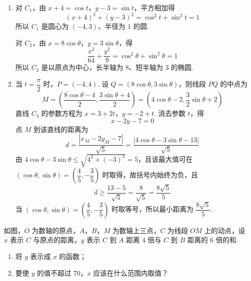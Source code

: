 \begin{solution}
\begin{enumerate}
\item 对 \(C_1\)，由 \(x+4=\cos t\)，\(y-3=\sin t\)，平方相加得
\[
(x+4)^2+(y-3)^2=\cos^2t+\sin^2t=1
\]
所以 \(C_1\) 是圆心为 \((-4,3)\)、半径为 \(1\) 的圆.

对 \(C_2\)，由 \(x=8\cos\theta\)，\(y=3\sin\theta\)，得
\[
\frac{x^2}{64}+\frac{y^2}{9}=\cos^2\theta+\sin^2\theta=1
\]
所以 \(C_2\) 是以原点为中心，长半轴为 \(8\)、短半轴为 \(3\) 的椭圆.

\item 当 \(t=\dfrac\pi2\) 时，\(P=(-4,4)\). 设 \(Q=(8\cos\theta,3\sin\theta)\)，则线段 \(PQ\) 的中点为
\[
M=\left(\frac{8\cos\theta-4}{2},\frac{3\sin\theta+4}{2}\right)=\left(4\cos\theta-2,\frac32\sin\theta+2\right)
\]
直线 \(C_3\) 的参数方程为 \(x=3+2t\)，\(y=-2+t\). 消去参数 \(t\)，得
\[
x-2y-7=0
\]
点 \(M\) 到该直线的距离为
\[
d=\frac{|x_M-2y_M-7|}{\sqrt5}=\frac{|4\cos\theta-3\sin\theta-13|}{\sqrt5}
\]
由 \(4\cos\theta-3\sin\theta\leqslant\sqrt{4^2+(-3)^2}=5\)，且该最大值可在 \((\cos\theta,\sin\theta)=\left(\dfrac45,-\dfrac35\right)\) 时取得，故括号内始终为负，且
\[
d\geqslant\frac{13-5}{\sqrt5}=\frac{8}{\sqrt5}=\frac{8\sqrt5}{5}
\]
当 \((\cos\theta,\sin\theta)=\left(\dfrac45,-\dfrac35\right)\) 时取等号，所以最小距离为 \(\dfrac{8\sqrt5}{5}\).
\end{enumerate}
\end{solution}

\begin{problem}
如图，\(O\) 为数轴的原点，\(A\)，\(B\)，\(M\) 为数轴上三点，\(C\) 为线段 \(OM\) 上的动点，设 \(x\) 表示 \(C\) 与原点的距离，\(y\) 表示 \(C\) 到 \(A\) 距离 \(4\) 倍与 \(C\) 到 \(B\) 距离的 \(6\) 倍的和.

\begin{enumerate}
\item 将 \(y\) 表示成 \(x\) 的函数；
\item 要使 \(y\) 的值不超过 \(70\)，\(x\) 应该在什么范围内取值？
\end{enumerate}

\end{problem}

